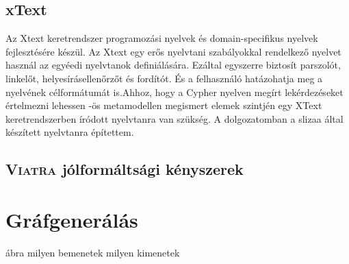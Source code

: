 \subsection{xText}
Az Xtext keretrendszer programozási nyelvek  és  domain-specifikus nyelvek fejlesztésére készül. Az Xtext  
egy erős nyelvtani szabályokkal rendelkező nyelvet használ az egyéedi nyelvtanok definiálására. Ezáltal
egyszerre biztosít parszolót, linkelőt, helyesírásellenőrzőt és fordítót. És a felhasználó hatázohatja 
meg a nyelvének célformátumát is.Ahhoz, hogy a Cypher nyelven megírt lekérdezéseket értelmezni lehessen 
-ös metamodellen megismert elemek szintjén egy XText \cite{xText} keretrendszerben
íródott nyelvtanra van szükség. A dolgozatomban a slizaa\cite{slizaa_2018} által készített nyelvtanra építettem.


\subsection{\textsc{Viatra} jólformáltsági kényszerek}

\section{Gráfgenerálás}

ábra milyen bemenetek milyen kimenetek





